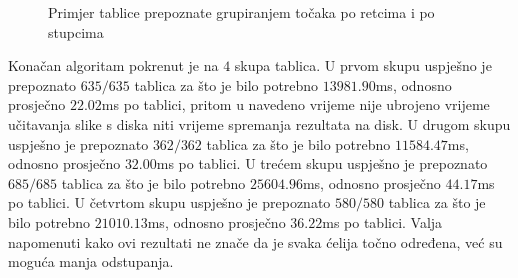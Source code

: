 \documentclass[times, utf8, zavrsni, numeric]{fer}
\begin{document}
\begin{figure}[ht!]
    \centering
    \captionsetup{justification=centering}
    \caption{Primjer tablice prepoznate grupiranjem točaka po retcima i po stupcima}
    \label{fig:tableV2}
\end{figure}

Konačan algoritam pokrenut je na $4$ skupa tablica.
U prvom skupu uspješno je prepoznato $635/635$ tablica za što je bilo potrebno $13981.90$ms, odnosno prosječno $22.02$ms po tablici, pritom u navedeno vrijeme nije ubrojeno vrijeme učitavanja slike s diska niti vrijeme spremanja rezultata na disk.
U drugom skupu uspješno je prepoznato $362/362$ tablica za što je bilo potrebno $11584.47$ms, odnosno prosječno $32.00$ms po tablici.
U trećem skupu uspješno je prepoznato $685/685$ tablica za što je bilo potrebno $25604.96$ms, odnosno prosječno $44.17$ms po tablici.
U četvrtom skupu uspješno je prepoznato $580/580$ tablica za što je bilo potrebno $21010.13$ms, odnosno prosječno $36.22$ms po tablici.
Valja napomenuti kako ovi rezultati ne znače da je svaka ćelija točno određena, već su moguća manja odstupanja.\\
\end{document}
